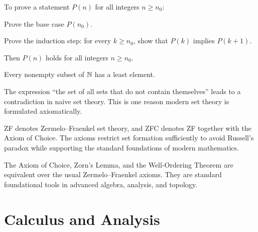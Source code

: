     \begin{algorithm}
        To prove a statement $P(n)$ for all integers $n\geq n_0$:
        \begin{bookitems}
            \item Prove the base case $P(n_0)$.
            \item Prove the induction step: for every $k\geq n_0$, show that
                  $P(k)$ implies $P(k+1)$.
        \end{bookitems}
        Then $P(n)$ holds for all integers $n\geq n_0$.
    \end{algorithm}

    \begin{theorem}
        Every nonempty subset of $\mathbb{N}$ has a least element.
    \end{theorem}

    \begin{fact}
        The expression ``the set of all sets that do not contain themselves''
        leads to a contradiction in naive set theory. This is one reason modern
        set theory is formulated axiomatically.
    \end{fact}

    \begin{fact}
        ZF denotes Zermelo--Fraenkel set theory, and ZFC denotes ZF together
        with the Axiom of Choice. The axioms restrict set formation sufficiently
        to avoid Russell's paradox while supporting the standard foundations of
        modern mathematics.
    \end{fact}

    \begin{fact}
        The Axiom of Choice, Zorn's Lemma, and the Well-Ordering Theorem are
        equivalent over the usual Zermelo--Fraenkel axioms. They are standard
        foundational tools in advanced algebra, analysis, and topology.
    \end{fact}

    \chapter{Calculus and Analysis}



